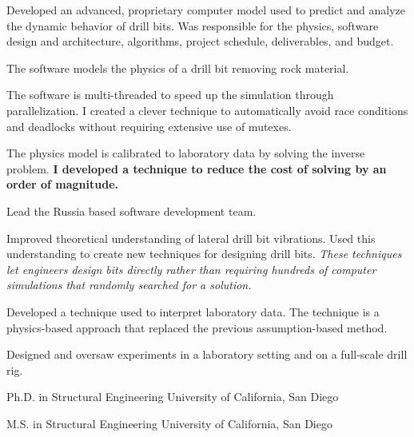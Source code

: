 \documentclass{leresume}
\begin{document}
		\begin{bulletedlist}
			
		\item 
					Developed an advanced, proprietary computer model used to predict and analyze the dynamic behavior of drill bits.  Was responsible for the physics, software design and architecture, algorithms, project schedule, deliverables, and budget.
					
		\begin{bulletedlist}
			
		\item 
							The software models the physics of a drill bit removing rock material.
						
		\item 
							The software is multi-threaded to speed up the simulation through parallelization.  I created a clever technique to automatically avoid race conditions and deadlocks without requiring extensive use of mutexes.
						
		\item 
							The physics model is calibrated to laboratory data by solving the inverse problem.  
		\textbf{I developed a technique to reduce the cost of solving by an order of magnitude.}
	
		\item Lead the Russia based software development team.
		\end{bulletedlist}
	
		\item Improved theoretical understanding of lateral drill bit vibrations.  Used this understanding to create new techniques for designing drill bits.  
		\textit{These techniques let engineers design bits directly rather than requiring hundreds of computer simulations that randomly searched for a solution.}
	
		\item Developed a technique used to interpret laboratory data.  The technique is a physics-based approach that replaced the previous assumption-based method.
		\item Designed and oversaw experiments in a laboratory setting and on a full-scale drill rig.
		\end{bulletedlist}
	

	
                {Ph.D. in Structural Engineering}
                {University of California, San Diego}
		
                {M.S. in Structural Engineering}
                {University of California, San Diego}
		
\end{document}
